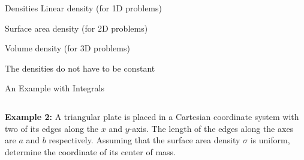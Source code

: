 \documentclass[12pt,compress,aspectratio=169]{beamer}
\begin{document}
\begin{frame}{Densities}
  Linear density (for 1D problems)


  Surface area density (for 2D problems)


  Volume density (for 3D problems)

  
  The densities do not have to be constant
\end{frame}


\begin{frame}{An Example with Integrals}
  \begin{columns}
    \textbf{Example 2:} A triangular plate is placed in a Cartesian coordinate
    system with two of its edges along the $x$ and $y$-axis. The length of the
    edges along the axes are $a$ and $b$ respectively. Assuming that the
    surface area density $\sigma$ is uniform, determine the coordinate of its
    center of mass.

  \end{columns}
\end{frame}



%
%      
\end{document}
